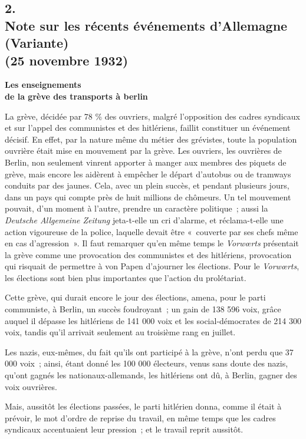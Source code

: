 \documentclass[french,twoside]{book} %
\begin{document}
\subsection[2. Note sur les récents événements d’Allemagne (Variante) (25 novembre 1932)]{2. \\
Note sur les récents événements d’Allemagne (Variante) \\
(25 novembre 1932)}
\noindent \par
\textbf{Les enseignements \\
de la grève des transports à berlin}\par
La grève, décidée par 78 \% des ouvriers, malgré l'opposition des cadres syndicaux et sur l'appel des communistes et des hitlériens, faillit constituer un événement décisif. En effet, par la nature même du métier des grévistes, toute la population ouvrière était mise en mouvement par la grève. Les ouvriers, les ouvrières de Berlin, non seulement vinrent apporter à manger aux membres des piquets de grève, mais encore les aidèrent à empêcher le départ d'autobus ou de tramways conduits par des jaunes. Cela, avec un plein succès, et pendant plusieurs jours, dans un pays qui compte près de huit millions de chômeurs. Un tel mouvement pouvait, d'un moment à l'autre, prendre un caractère politique ; aussi la {\itshape Deutsche Allgemeine Zeitung} jeta-t-elle un cri d'alarme, et réclama-t-elle une action vigoureuse de la police, laquelle devait être « couverte par ses chefs même en cas d'agression ». Il faut remarquer qu'en même temps le {\itshape Vorwœrts} présentait la grève comme une provocation des communistes et des hitlériens, provocation qui risquait de permettre à von Papen d'ajourner les élections. Pour le {\itshape Vorwœrts}, les élections sont bien plus importantes que l'action du prolétariat.\par
Cette grève, qui durait encore le jour des élections, amena, pour le parti communiste, à Berlin, un succès foudroyant ; un gain de 138 596 voix, grâce auquel il dépasse les hitlériens de 141 000 voix et les social-démocrates de 214 300 voix, tandis qu'il arrivait seulement au troisième rang en juillet.\par
Les nazis, eux-mêmes, du fait qu'ils ont participé à la grève, n'ont perdu que 37 000 voix ; ainsi, étant donné les 100 000 électeurs, venus sans doute des nazis, qu'ont gagnés les nationaux-allemands, les hitlériens ont dû, à Berlin, gagner des voix ouvrières.\par
Mais, aussitôt les élections passées, le parti hitlérien donna, comme il était à prévoir, le mot d'ordre de reprise du travail, en même temps que les cadres syndicaux accentuaient leur pression ; et le travail reprit aussitôt.\par
\end{document}
